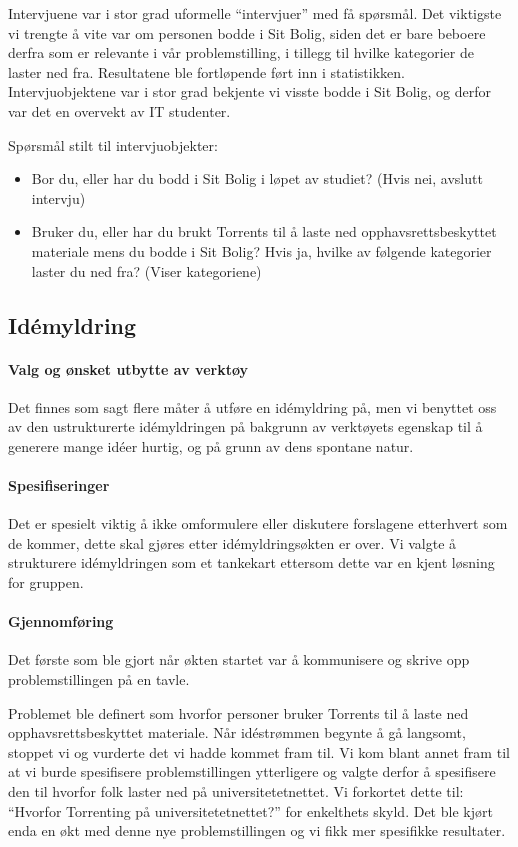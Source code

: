 Intervjuene var i stor grad uformelle ``intervjuer'' med få spørsmål. Det viktigste vi trengte å vite var om personen bodde i Sit Bolig, siden det er bare beboere derfra som er relevante i vår problemstilling, i tillegg til hvilke kategorier de laster ned fra. Resultatene ble fortløpende ført inn i statistikken. Intervjuobjektene var i stor grad bekjente vi visste bodde i Sit Bolig, og derfor var det en overvekt av IT studenter.

Spørsmål stilt til intervjuobjekter:
\begin{itemize}
    \item Bor du, eller har du bodd i Sit Bolig i løpet av studiet? (Hvis nei, avslutt intervju)
    \item Bruker du, eller har du brukt Torrents til å laste ned opphavsrettsbeskyttet materiale mens du bodde i Sit Bolig? Hvis ja, hvilke av følgende kategorier laster du ned fra? (Viser kategoriene)
\end{itemize}


\subsection{Idémyldring}

\paragraph{Valg og ønsket utbytte av verktøy}
Det finnes som sagt flere måter å utføre en idémyldring på, men vi benyttet oss av den ustrukturerte idémyldringen på bakgrunn av verktøyets egenskap til å generere mange idéer hurtig, og på grunn av dens spontane natur. 

\paragraph{Spesifiseringer}
Det er spesielt viktig å ikke omformulere eller diskutere forslagene etterhvert som de kommer, dette skal gjøres etter idémyldringsøkten er over. Vi valgte å strukturere idémyldringen som et tankekart ettersom dette var en kjent løsning for gruppen. 

\paragraph{Gjennomføring}
Det første som ble gjort når økten startet var å kommunisere og skrive opp problemstillingen på en tavle. 

Problemet ble definert som hvorfor personer bruker Torrents til å laste ned opphavsrettsbeskyttet materiale. Når idéstrømmen begynte å gå langsomt, stoppet vi og vurderte det vi hadde kommet fram til. Vi kom blant annet fram til at vi burde spesifisere problemstillingen ytterligere og valgte derfor å spesifisere den til hvorfor folk laster ned på universitetetnettet. Vi forkortet dette til: ``Hvorfor Torrenting på universitetetnettet?'' for enkelthets skyld. Det ble kjørt enda en økt med denne nye problemstillingen og vi fikk mer spesifikke resultater.


